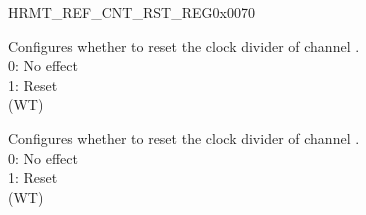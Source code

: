 \begin{register}{H}{RMT\_REF\_CNT\_RST\_REG}{0x0070}\label{regdesc:RMTREFCNTRSTREG}
%
%
%
%
%
\regnewline%
\begin{regdesc}\begin{reglist}
\label{fielddesc:RMTREFCNTRSTCHN}\item [RMT\_REF\_CNT\_RST\_CH\regindex{n}] Configures whether to reset the clock divider of channel . \\
0: No effect\\
1: Reset\\
(WT)
\label{fielddesc:RMTREFCNTRSTCHM}\item [RMT\_REF\_CNT\_RST\_CH\regindex{m}] Configures whether to reset the clock divider of channel . \\
0: No effect\\
1: Reset\\
(WT)
\end{reglist}\end{regdesc}
\end{register}



